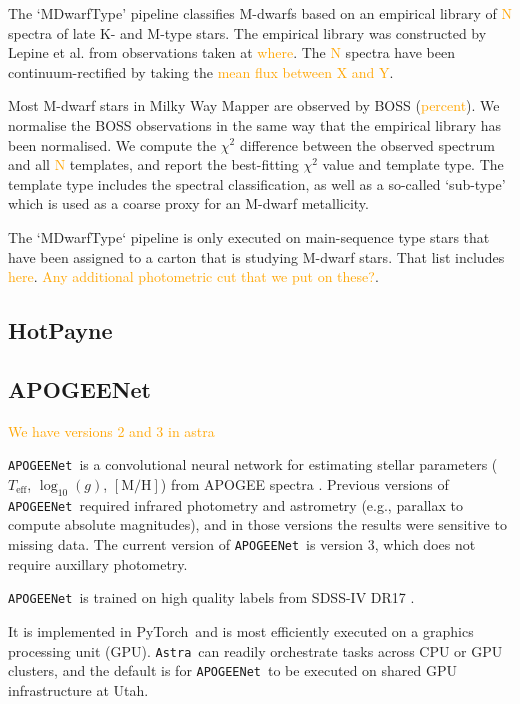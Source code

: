 \documentclass[modern]{aastex631}
\newcommand{\astra}{\texttt{Astra}}
\newcommand{\Astra}{\astra}
\newcommand{\pipeline}[1]{\texttt{#1}}
\newcommand{\APOGEENet}{\pipeline{APOGEENet}}
\newcommand{\pytorch}{PyTorch}
\newcommand{\todo}[1]{\textcolor{orange}{#1}}
\newcommand{\teff}{T_\mathrm{eff}}
\newcommand{\logg}{\log_{10}(g)}
\newcommand{\mh}{[\mathrm{M/H}]}
\begin{document}
The `MDwarfType' pipeline classifies M-dwarfs based on an empirical library of \todo{N} spectra of late K- and M-type stars. The empirical library was constructed by Lepine et al. from observations taken at \todo{where}. The \todo{N} spectra have been continuum-rectified by taking the \todo{mean flux between X and Y}.

Most M-dwarf stars in Milky Way Mapper are observed by BOSS (\todo{percent}). We normalise the BOSS observations in the same way that the empirical library has been normalised. We compute the $\chi^2$ difference between the observed spectrum and all \todo{N} templates, and report the best-fitting $\chi^2$ value and template type. The template type includes the spectral classification, as well as a so-called `sub-type' which is used as a coarse proxy for an M-dwarf metallicity.

The `MDwarfType` pipeline is only executed on main-sequence type stars that have been assigned to a carton that is studying M-dwarf stars. That list includes \todo{here}. \todo{Any additional photometric cut that we put on these?}.



\subsection{HotPayne} \label{sec:methods-hot-payne}

\subsection{APOGEENet} \label{sec:methods-apogee-net}

\todo{We have versions 2 and 3 in astra}

\APOGEENet\ is a convolutional neural network for estimating stellar parameters ($\teff$, $\logg$, $\mh$) from APOGEE spectra \citep{apogeenet}. Previous versions of \APOGEENet\ required infrared photometry and astrometry (e.g., parallax to compute absolute magnitudes), and in those versions the results were sensitive to missing data. The current version of \APOGEENet\ is version 3, which does not require auxillary photometry. 

\APOGEENet\ is trained on high quality labels from SDSS-IV DR17 \citep{dr17}. 

It is implemented in \pytorch\ and is most efficiently executed on a graphics processing unit (GPU). \Astra\ can readily orchestrate tasks across CPU or GPU clusters, and the default is for \APOGEENet\ to be executed on shared GPU infrastructure at Utah.
\end{document}
